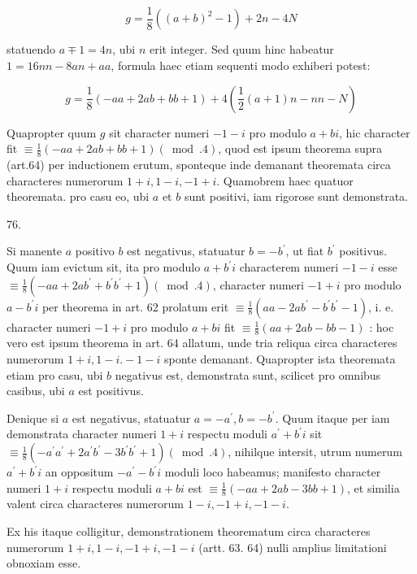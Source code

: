 \documentclass[10pt]{article}
\begin{document}
\[
g=\frac{1}{8}\left((a+b)^{2}-1\right)+2 n-4 N
\]

statuendo \(a \mp 1=4 n\), ubi \(n\) erit integer. Sed quum hinc habeatur \(1=16 n n-8 a n+a a\), formula haec etiam sequenti modo exhiberi potest:

\[
g=\frac{1}{8}(-a a+2 a b+b b+1)+4\left(\frac{1}{2}(a+1) n-n n-N\right)
\]

Quapropter quum \(g\) sit character numeri \(-1-i\) pro modulo \(a+b i\), hic character fit \(\equiv \frac{1}{8}(-a a+2 a b+b b+1)(\bmod .4)\), quod est ipsum theorema supra (art.64) per inductionem erutum, sponteque inde demanant theoremata circa characteres numerorum \(1+i, 1-i,-1+i\). Quamobrem haec quatuor theoremata. pro casu eo, ubi \(a\) et \(b\) sunt positivi, iam rigorose sunt demonstrata.

76.

Si manente \(a\) positivo \(b\) est negativus, statuatur \(b=-b^{\prime}\), ut fiat \(b^{\prime}\) positivus. Quum iam evictum sit, ita pro modulo \(a+b^{\prime} i\) characterem numeri \(-1-i\) esse \(\equiv \frac{1}{8}\left(-a a+2 a b^{\prime}+b^{\prime} b^{\prime}+1\right)(\bmod .4)\), character numeri \(-1+i\) pro modulo \(a-b^{\prime} i\) per theorema in art. 62 prolatum erit \(\equiv \frac{1}{8}\left(a a-2 a b^{\prime}-b^{\prime} b^{\prime}-1\right)\), i. e. character numeri \(-1+i\) pro modulo \(a+b i\) fit \(\equiv \frac{1}{8}(a a+2 a b-b b-1)\) : hoc vero est ipsum theorema in art. 64 allatum, unde tria reliqua circa characteres numerorum \(1+i, 1-i .-1-i\) sponte demanant. Quapropter ista theoremata etiam pro casu, ubi \(b\) negativus est, demonstrata sunt, scilicet pro omnibus casibus, ubi \(a\) est positivus.

Denique si \(a\) est negativus, statuatur \(a=-a^{\prime}, b=-b^{\prime}\). Quum itaque per iam demonstrata character numeri \(1+i\) respectu moduli \(a^{\prime}+b^{\prime} i\) sit \(\equiv \frac{1}{8}\left(-a^{\prime} a^{\prime}+2 a^{\prime} b^{\prime}-3 b^{\prime} b^{\prime}+1\right)(\bmod .4)\), nihilque intersit, utrum numerum \(a^{\prime}+b^{\prime} i\) an oppositum \(-a^{\prime}-b^{\prime} i\) moduli loco habeamus; manifesto character numeri \(1+i\) respectu moduli \(a+b i\) est \(\equiv \frac{1}{8}(-a a+2 a b-3 b b+1)\), et similia valent circa characteres numerorum \(1-i,-1+i,-1-i\).

Ex his itaque colligitur, demonstrationem theorematum circa characteres numerorum \(1+i, 1-i,-1+i,-1-i\) (artt. 63. 64) nulli amplius limitationi obnoxiam esse.
\end{document}
